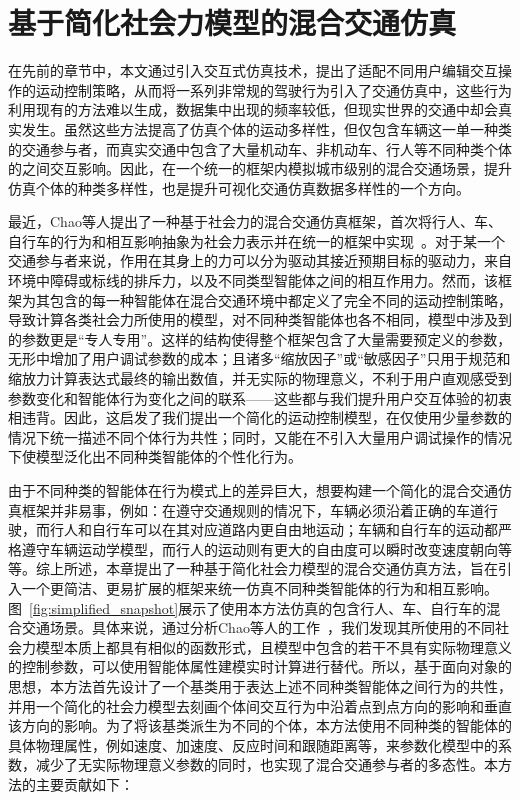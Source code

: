 
\chapter{基于简化社会力模型的混合交通仿真}
\label{chapter:simplified}


在先前的章节中，本文通过引入交互式仿真技术，提出了适配不同用户编辑交互操作的运动控制策略，从而将一系列非常规的驾驶行为引入了交通仿真中，这些行为利用现有的方法难以生成，数据集中出现的频率较低，但现实世界的交通中却会真实发生。虽然这些方法提高了仿真个体的运动多样性，但仅包含车辆这一单一种类的交通参与者，而真实交通中包含了大量机动车、非机动车、行人等不同种类个体的之间交互影响。因此，在一个统一的框架内模拟城市级别的混合交通场景，提升仿真个体的种类多样性，也是提升可视化交通仿真数据多样性的一个方向。


最近，Chao等人提出了一种基于社会力的混合交通仿真框架，首次将行人、车、自行车的行为和相互影响抽象为社会力表示并在统一的框架中实现~\cite{chao2019force}。对于某一个交通参与者来说，作用在其身上的力可以分为驱动其接近预期目标的驱动力，来自环境中障碍或标线的排斥力，以及不同类型智能体之间的相互作用力。然而，该框架为其包含的每一种智能体在混合交通环境中都定义了完全不同的运动控制策略，导致计算各类社会力所使用的模型，对不同种类智能体也各不相同，模型中涉及到的参数更是“专人专用”。这样的结构使得整个框架包含了大量需要预定义的参数，无形中增加了用户调试参数的成本；且诸多“缩放因子”或“敏感因子”只用于规范和缩放力计算表达式最终的输出数值，并无实际的物理意义，不利于用户直观感受到参数变化和智能体行为变化之间的联系——这些都与我们提升用户交互体验的初衷相违背。因此，这启发了我们提出一个简化的运动控制模型，在仅使用少量参数的情况下统一描述不同个体行为共性；同时，又能在不引入大量用户调试操作的情况下使模型泛化出不同种类智能体的个性化行为。


由于不同种类的智能体在行为模式上的差异巨大，想要构建一个简化的混合交通仿真框架并非易事，例如：在遵守交通规则的情况下，车辆必须沿着正确的车道行驶，而行人和自行车可以在其对应道路内更自由地运动；车辆和自行车的运动都严格遵守车辆运动学模型，而行人的运动则有更大的自由度可以瞬时改变速度朝向等等。综上所述，本章提出了一种基于简化社会力模型的混合交通仿真方法，旨在引入一个更简洁、更易扩展的框架来统一仿真不同种类智能体的行为和相互影响。图~\ref{fig:simplified_snapshot}展示了使用本方法仿真的包含行人、车、自行车的混合交通场景。具体来说，通过分析Chao等人的工作~\cite{chao2019force}，我们发现其所使用的不同社会力模型本质上都具有相似的函数形式，且模型中包含的若干不具有实际物理意义的控制参数，可以使用智能体属性建模实时计算进行替代。所以，基于面向对象的思想，本方法首先设计了一个基类用于表达上述不同种类智能体之间行为的共性，并用一个简化的社会力模型去刻画个体间交互行为中沿着点到点方向的影响和垂直该方向的影响。为了将该基类派生为不同的个体，本方法使用不同种类的智能体的具体物理属性，例如速度、加速度、反应时间和跟随距离等，来参数化模型中的系数，减少了无实际物理意义参数的同时，也实现了混合交通参与者的多态性。本方法的主要贡献如下：

